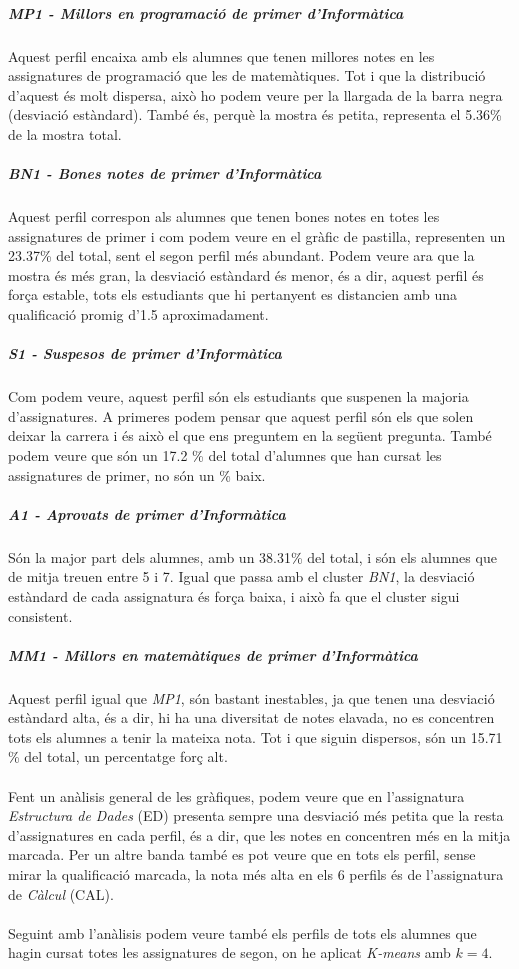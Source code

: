 \documentclass[12pt,a4paper,catalan]{article}
\begin{document}
\subparagraph{MP1 - Millors en programació de primer d'Informàtica} 
Aquest perfil encaixa amb els alumnes que tenen millores notes en les assignatures de programació que les de matemàtiques. Tot i que la distribució d'aquest és molt dispersa, això ho podem veure per la llargada de la barra negra (desviació estàndard). També és, perquè la mostra és petita, representa el 5.36\% de la mostra total.

\subparagraph{BN1 - Bones notes de primer d'Informàtica}
Aquest perfil correspon als alumnes que tenen bones notes en totes les assignatures de primer i com podem veure en el gràfic de pastilla, representen un 23.37\% del total, sent el segon perfil més abundant. Podem veure ara que la mostra és més gran, la desviació estàndard és menor, és a dir, aquest perfil és força estable, tots els estudiants que hi pertanyent es distancien amb una qualificació promig d'1.5 aproximadament.

\subparagraph{S1 - Suspesos de primer d'Informàtica}
Com podem veure, aquest perfil són els estudiants que suspenen la majoria d'assignatures. A primeres podem pensar que aquest perfil són els que solen deixar la carrera i és això el que ens preguntem en la següent pregunta. També podem veure que són un 17.2 \% del total d'alumnes que han cursat les assignatures de primer, no són un \% baix.

\subparagraph{A1 - Aprovats de primer d'Informàtica}
Són la major part dels alumnes, amb un 38.31\% del total, i són els alumnes que de mitja treuen entre 5 i 7. Igual que passa amb el cluster \textit{BN1}, la desviació estàndard de cada assignatura és força baixa, i això fa que el cluster sigui consistent.

\subparagraph{MM1 - Millors en matemàtiques de primer d'Informàtica}
Aquest perfil igual que \textit{MP1}, són bastant inestables, ja que tenen una desviació estàndard alta, és a dir, hi ha una diversitat de notes elavada, no es concentren tots els alumnes a tenir la mateixa nota. Tot i que siguin dispersos, són un 15.71 \% del total, un percentatge forç alt.
\\
\\
Fent un anàlisis general de les gràfiques, podem veure que en l'assignatura \textit{Estructura de Dades} (ED) presenta sempre una desviació més petita que la resta d'assignatures en cada perfil, és a dir, que les notes en concentren més en la mitja marcada. Per un altre banda també es pot veure que en tots els perfil, sense mirar la qualificació marcada, la nota més alta en els 6 perfils és de l'assignatura de \textit{Càlcul} (CAL).
\\
\\
Seguint amb l'anàlisis podem veure també els perfils de tots els alumnes que hagin cursat totes les assignatures de segon, on he aplicat \textit{K-means} amb $k=4$.
\end{document}
